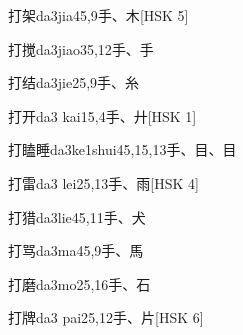 \begin{EntryWithPhonetic}{打架}{da3jia4}{5,9}{⼿、⽊}[HSK 5]
\end{EntryWithPhonetic}

\begin{EntryWithPhonetic}{打搅}{da3jiao3}{5,12}{⼿、⼿}
\end{EntryWithPhonetic}

\begin{EntryWithPhonetic}{打结}{da3jie2}{5,9}{⼿、⽷}
\end{EntryWithPhonetic}

\begin{EntryWithPhonetic}{打开}{da3 kai1}{5,4}{⼿、⼶}[HSK 1]
\end{EntryWithPhonetic}

\begin{EntryWithPhonetic}{打瞌睡}{da3ke1shui4}{5,15,13}{⼿、⽬、⽬}
\end{EntryWithPhonetic}

\begin{EntryWithPhonetic}{打雷}{da3 lei2}{5,13}{⼿、⾬}[HSK 4]
\end{EntryWithPhonetic}

\begin{EntryWithPhonetic}{打猎}{da3lie4}{5,11}{⼿、⽝}
\end{EntryWithPhonetic}

\begin{EntryWithPhonetic}{打骂}{da3ma4}{5,9}{⼿、⾺}
\end{EntryWithPhonetic}

\begin{EntryWithPhonetic}{打磨}{da3mo2}{5,16}{⼿、⽯}
\end{EntryWithPhonetic}

\begin{EntryWithPhonetic}{打牌}{da3 pai2}{5,12}{⼿、⽚}[HSK 6]
\end{EntryWithPhonetic}

